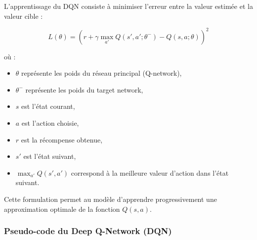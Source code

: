 \documentclass[12pt,a4paper]{report}
\begin{document}
L’apprentissage du DQN consiste à minimiser l’erreur entre la valeur estimée et la valeur cible :

\begin{equation}
L(\theta) = \left( r + \gamma \max_{a'} Q(s', a'; \theta^{-}) - Q(s, a; \theta) \right)^2
\end{equation}

où :
\begin{itemize}
    \item $\theta$ représente les poids du réseau principal (Q-network),
    \item $\theta^{-}$ représente les poids du target network,
    \item $s$ est l’état courant,
    \item $a$ est l’action choisie,
    \item $r$ est la récompense obtenue,
    \item $s'$ est l’état suivant,
    \item $\max_{a'} Q(s',a')$ correspond à la meilleure valeur d’action dans l’état suivant.
\end{itemize}

Cette formulation permet au modèle d’apprendre progressivement une approximation optimale de la fonction $Q(s,a)$.

\subsubsection{Pseudo-code du Deep Q-Network (DQN)}
\end{document}
